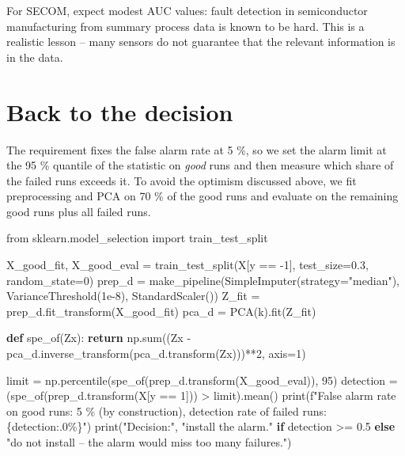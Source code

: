 \documentclass[
  letterpaper,
  DIV=11,
  numbers=noendperiod]{scrreprt}
\newenvironment{Shaded}{\begin{snugshade}}{\end{snugshade}}
\newcommand{\BuiltInTok}[1]{\textcolor[rgb]{0.00,0.23,0.31}{#1}}
\newcommand{\ControlFlowTok}[1]{\textcolor[rgb]{0.00,0.23,0.31}{\textbf{#1}}}
\newcommand{\DecValTok}[1]{\textcolor[rgb]{0.68,0.00,0.00}{#1}}
\newcommand{\FloatTok}[1]{\textcolor[rgb]{0.68,0.00,0.00}{#1}}
\newcommand{\ImportTok}[1]{\textcolor[rgb]{0.00,0.46,0.62}{#1}}
\newcommand{\KeywordTok}[1]{\textcolor[rgb]{0.00,0.23,0.31}{\textbf{#1}}}
\newcommand{\NormalTok}[1]{\textcolor[rgb]{0.00,0.23,0.31}{#1}}
\newcommand{\OperatorTok}[1]{\textcolor[rgb]{0.37,0.37,0.37}{#1}}
\newcommand{\SpecialCharTok}[1]{\textcolor[rgb]{0.37,0.37,0.37}{#1}}
\newcommand{\SpecialStringTok}[1]{\textcolor[rgb]{0.13,0.47,0.30}{#1}}
\newcommand{\StringTok}[1]{\textcolor[rgb]{0.13,0.47,0.30}{#1}}
\begin{document}
For SECOM, expect modest AUC values: fault detection in semiconductor
manufacturing from summary process data is known to be hard. This is a
realistic lesson -- many sensors do not guarantee that the relevant
information is in the data.

\section{Back to the decision}\label{back-to-the-decision-8}

The requirement fixes the false alarm rate at 5 \%, so we set the alarm
limit at the 95 \% quantile of the statistic on \emph{good} runs and
then measure which share of the failed runs exceeds it. To avoid the
optimism discussed above, we fit preprocessing and PCA on 70 \% of the
good runs and evaluate on the remaining good runs plus all failed runs.

\begin{Shaded}
\begin{Highlighting}[]
\ImportTok{from}\NormalTok{ sklearn.model\_selection }\ImportTok{import}\NormalTok{ train\_test\_split}

\NormalTok{X\_good\_fit, X\_good\_eval }\OperatorTok{=}\NormalTok{ train\_test\_split(X[y }\OperatorTok{==} \OperatorTok{{-}}\DecValTok{1}\NormalTok{], test\_size}\OperatorTok{=}\FloatTok{0.3}\NormalTok{, random\_state}\OperatorTok{=}\DecValTok{0}\NormalTok{)}
\NormalTok{prep\_d }\OperatorTok{=}\NormalTok{ make\_pipeline(SimpleImputer(strategy}\OperatorTok{=}\StringTok{"median"}\NormalTok{), VarianceThreshold(}\FloatTok{1e{-}8}\NormalTok{), StandardScaler())}
\NormalTok{Z\_fit }\OperatorTok{=}\NormalTok{ prep\_d.fit\_transform(X\_good\_fit)}
\NormalTok{pca\_d }\OperatorTok{=}\NormalTok{ PCA(k).fit(Z\_fit)}

\KeywordTok{def}\NormalTok{ spe\_of(Zx):}
    \ControlFlowTok{return}\NormalTok{ np.}\BuiltInTok{sum}\NormalTok{((Zx }\OperatorTok{{-}}\NormalTok{ pca\_d.inverse\_transform(pca\_d.transform(Zx)))}\OperatorTok{**}\DecValTok{2}\NormalTok{, axis}\OperatorTok{=}\DecValTok{1}\NormalTok{)}

\NormalTok{limit }\OperatorTok{=}\NormalTok{ np.percentile(spe\_of(prep\_d.transform(X\_good\_eval)), }\DecValTok{95}\NormalTok{)}
\NormalTok{detection }\OperatorTok{=}\NormalTok{ (spe\_of(prep\_d.transform(X[y }\OperatorTok{==} \DecValTok{1}\NormalTok{])) }\OperatorTok{\textgreater{}}\NormalTok{ limit).mean()}
\BuiltInTok{print}\NormalTok{(}\SpecialStringTok{f"False alarm rate on good runs: 5 \% (by construction), detection rate of failed runs: }\SpecialCharTok{\{}\NormalTok{detection}\SpecialCharTok{:.0\%\}}\SpecialStringTok{"}\NormalTok{)}
\BuiltInTok{print}\NormalTok{(}\StringTok{"Decision:"}\NormalTok{, }\StringTok{"install the alarm."} \ControlFlowTok{if}\NormalTok{ detection }\OperatorTok{\textgreater{}=} \FloatTok{0.5} \ControlFlowTok{else} \StringTok{"do not install – the alarm would miss too many failures."}\NormalTok{)}
\end{Highlighting}
\end{Shaded}
\end{document}
